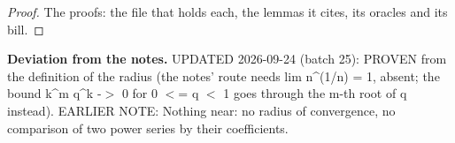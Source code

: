 %
\renewcommand{\thethm}{2.9}
\begin{lem}\label{thm:cps-radius-poly-factor}
%
%
\end{lem}
%
\begin{proof}
%
The proofs: the file that holds each, the lemmas it cites, its oracles and its bill.
%
%
\end{proof}
%
\noindent\textbf{Deviation from the notes.} UPDATED 2026-09-24 (batch 25): PROVEN from the definition of the radius (the notes' route needs lim n\textasciicircum{}(1/n) = 1, absent; the bound k\textasciicircum{}m q\textasciicircum{}k -$>$ 0 for 0 $<$= q $<$ 1 goes through the m-th root of q instead). EARLIER NOTE: Nothing near: no radius of convergence, no comparison of two power series by their coefficients.
%
\renewcommand{\thethm}{2.10}
